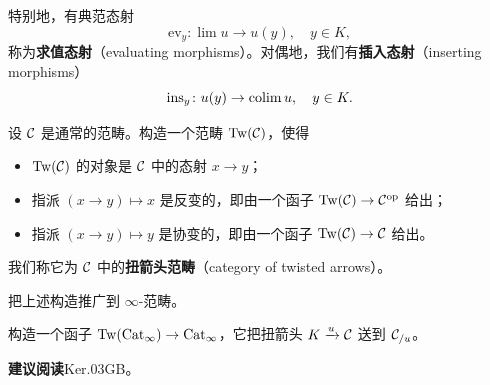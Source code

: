 特别地，有典范态射
\[
\mathrm{ev}_y\colon \lim u\to u(y),\quad y\in K,
\]
称为\textbf{求值态射}（evaluating morphisms）。对偶地，我们有\textbf{插入态射}（inserting morphisms）
\[
\mathrm{ins}_y\colon u(y)\to\operatorname{colim} u,\quad y\in K.
\]


\begin{exercise}\label{L6-A.1}
设 $\mathcal{C}$ 是通常的范畴。构造一个范畴 $\mathrm{Tw}(\mathcal{C})$，使得
\begin{itemize}[leftmargin=2.2em,itemsep=0.1em]
\item $\mathrm{Tw}(\mathcal{C})$ 的对象是 $\mathcal{C}$ 中的态射 $x\to y$；
\item 指派 $(x\to y)\mapsto x$ 是反变的，即由一个函子 $\mathrm{Tw}(\mathcal{C})\to\mathcal{C}^{\mathrm{op}}$ 给出；
\item 指派 $(x\to y)\mapsto y$ 是协变的，即由一个函子 $\mathrm{Tw}(\mathcal{C})\to\mathcal{C}$ 给出。
\end{itemize}
我们称它为 $\mathcal{C}$ 中的\textbf{扭箭头范畴}（category of twisted arrows）。
\end{exercise}

\begin{exercise}\label{L6-A.2}
把上述构造推广到 $\infty$-范畴。
\end{exercise}

\begin{exercise}\label{L6-A.3}
构造一个函子 $\mathrm{Tw}(\operatorname{Cat}_\infty)\to\operatorname{Cat}_\infty$，它把扭箭头 $K\xrightarrow{u}\mathcal{C}$ 送到 $\mathcal{C}_{/u}$。
\end{exercise}

\nitem\label{L6-A.4} \textbf{建议阅读}\quad Ker.03GB。
